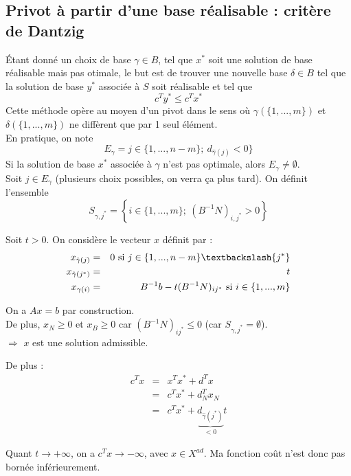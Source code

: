 \subsection{Privot à partir d'une base réalisable : critère de Dantzig}
Étant donné un choix de base $\gamma\in B$, tel que $x^*$ soit une solution de base réalisable mais pas otimale, le but est de trouver une nouvelle base $\delta\in B$ tel que la solution de base $y^*$ associée à $S$ soit réalisable et tel que 
\[c^Ty^*\leq c^Tx^*\]
Cette méthode opère au moyen d'un pivot dans le sens où $\gamma(\{1,...,m\})$ et $\delta(\{1,...,m\})$ ne diffèrent que par 1 seul élément.\\
En pratique, on note 
	\[E_{\gamma}=j\in\{1,...,n-m\};\ d_{\hat{\gamma}(j)}<0\}\]
Si la solution de base $x^*$ associée à $\gamma$ n'est pas optimale, alors $E_{\gamma}\neq \emptyset$.\\
Soit $j\in E_{\gamma}$ (plusieurs choix possibles, on verra ça plus tard). On définit l'ensemble 
	\[S_{\gamma,j^*}=\left\{i\in\{1,...,m\};\ (B^{-1}N)_{i,j^*}>0 \right\}\]


\begin{dem}
	Soit $t>0$. On considère le vecteur $x$ définit par :
\begin{eqnarray*}
	x_{\hat{\gamma}(j)}&=&0 \text{ si } j\in\{1,...,n-m\}\textbackslash \{j^*\}\\
	x_{\hat{\gamma}(j^*)}&=&t\\
	x_{\gamma(i)}&=&B^{-1}b-t(B^{-1}N)_{ij^*} \text{ si } i\in\{1,...,m\}
\end{eqnarray*}

On a $Ax=b$ par construction.\\
De plus, $x_N\geq 0$ et $x_B\geq 0$ car $(B^{-1}N)_{ij^*}\leq 0$ (car $S_{\gamma,j^*}=\emptyset$).\\
$\Rightarrow$ $x$ est une solution admissible.

\bigskip
De plus :
\begin{eqnarray*}
	c^Tx&=&x^Tx^*+d^Tx\\
		&=&c^Tx^*+d_N^Tx_N\\
		&=&c^Tx^*+\underbrace{d_{\hat{\gamma}(j^*)}}_{<0}t
\end{eqnarray*}

Quant $t\to +\infty$, on a $c^Tx\to -\infty$, avec $x\in X^{ad}$. Ma fonction coût n'est donc pas bornée inférieurement.
\end{dem}

